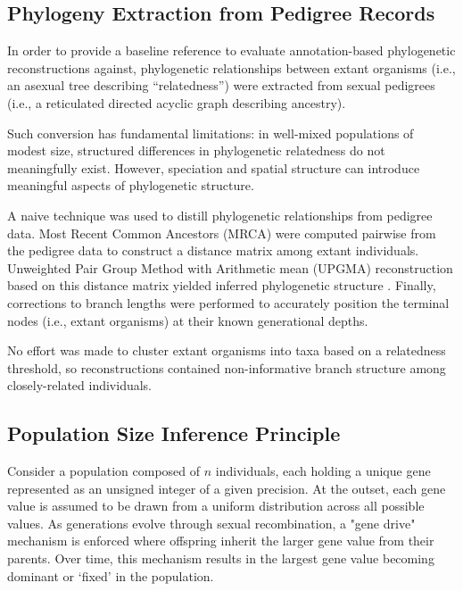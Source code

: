 \subsection{Phylogeny Extraction from Pedigree Records}
\label{sec:phylogeny-extraction}

In order to provide a baseline reference to evaluate annotation-based phylogenetic reconstructions against, phylogenetic relationships between extant organisms (i.e., an asexual tree describing ``relatedness'') were extracted from sexual pedigrees (i.e., a reticulated directed acyclic graph describing ancestry).

Such conversion has fundamental limitations: in well-mixed populations of modest size, structured differences in phylogenetic relatedness do not meaningfully exist.
However, speciation and spatial structure can introduce meaningful aspects of phylogenetic structure.

A naive technique was used to distill phylogenetic relationships from pedigree data.
Most Recent Common Ancestors (MRCA) were computed pairwise from the pedigree data to construct a distance matrix among extant individuals.
Unweighted Pair Group Method with Arithmetic mean (UPGMA) reconstruction based on this distance matrix yielded inferred phylogenetic structure \citep{sokal1958university}.
Finally, corrections to branch lengths were performed to accurately position the terminal nodes (i.e., extant organisms) at their known generational depths.

No effort was made to cluster extant organisms into taxa based on a relatedness threshold, so reconstructions contained non-informative branch structure among closely-related individuals.

\subsection{Population Size Inference Principle}
\label{sec:population-size-inference-principle}

Consider a population composed of $n$ individuals, each holding a unique gene represented as an unsigned integer of a given precision.
At the outset, each gene value is assumed to be drawn from a uniform distribution across all possible values.
As generations evolve through sexual recombination, a "gene drive" mechanism is enforced where offspring inherit the larger gene value from their parents.
Over time, this mechanism results in the largest gene value becoming dominant or `fixed' in the population.


